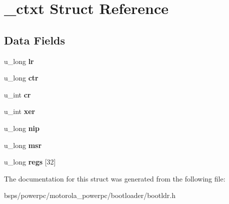 \hypertarget{struct__ctxt}{}\section{\+\_\+ctxt Struct Reference}
\label{struct__ctxt}
\subsection*{Data Fields}
\begin{DoxyCompactItemize}
\item 
\mbox{\label{struct__ctxt_a250ab0131d6e1376113f070c7bfbae0f}} 
u\+\_\+long {\bfseries lr}
\item 
\mbox{\label{struct__ctxt_a20468e348d732535a41fcdb842e839f2}} 
u\+\_\+long {\bfseries ctr}
\item 
\mbox{\label{struct__ctxt_a40ef35fcc12d0b4ab127c7ee0c07d5c2}} 
u\+\_\+int {\bfseries cr}
\item 
\mbox{\label{struct__ctxt_aa6af49ba0147b76fc43d77aa014e0143}} 
u\+\_\+int {\bfseries xer}
\item 
\mbox{\label{struct__ctxt_a79c5d5611be8ca5ed900258981043aa6}} 
u\+\_\+long {\bfseries nip}
\item 
\mbox{\label{struct__ctxt_a9d0d726e99cbb9aad1cbd84ef2c00195}} 
u\+\_\+long {\bfseries msr}
\item 
\mbox{\label{struct__ctxt_a43edcacbe4c0f67adc314ce983fa1dd7}} 
u\+\_\+long {\bfseries regs} \mbox{[}32\mbox{]}
\end{DoxyCompactItemize}


The documentation for this struct was generated from the following file\+:\begin{DoxyCompactItemize}
\item 
bsps/powerpc/motorola\+\_\+powerpc/bootloader/bootldr.\+h\end{DoxyCompactItemize}
